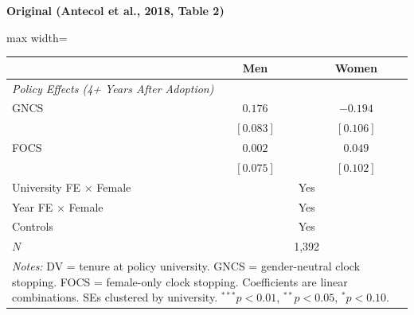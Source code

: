 \documentclass[11pt,a4paper]{article}
\begin{document}
\vspace{0.3cm}
\noindent{}

\vspace{0.5cm}
\begin{minipage}[t]{0.48\textwidth}
\centering
\textbf{\large Original (Antecol et al., 2018, Table 2)}
\vspace{0.3cm}

\begin{adjustbox}{max width=\textwidth}
\begin{tabular}{lcc}
\toprule
 & Men & Women \\
\midrule
\multicolumn{3}{l}{\textit{Policy Effects (4+ Years After Adoption)}} \\[3pt]
GNCS & $0.176$ & $-0.194$ \\
 & $[0.083]$ & $[0.106]$ \\[0.3em]
FOCS & $0.002$ & $0.049$ \\
 & $[0.075]$ & $[0.102]$ \\[0.3em]
\midrule
University FE $\times$ Female & \multicolumn{2}{c}{Yes} \\
Year FE $\times$ Female & \multicolumn{2}{c}{Yes} \\
Controls & \multicolumn{2}{c}{Yes} \\
$N$ & \multicolumn{2}{c}{1,392} \\
\bottomrule
\multicolumn{3}{p{0.95\textwidth}}{\footnotesize\textit{Notes:} DV = tenure at policy university. GNCS = gender-neutral clock stopping. FOCS = female-only clock stopping. Coefficients are linear combinations. SEs clustered by university. $^{***}p<0.01$, $^{**}p<0.05$, $^{*}p<0.10$.}
\end{tabular}
\end{adjustbox}
\end{minipage}%
\hfill
\end{document}
